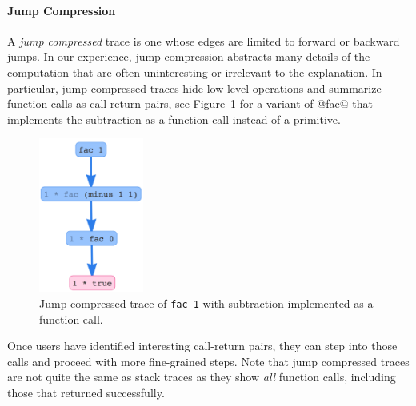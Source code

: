 \paragraph{Jump Compression}
%
A \emph{jump compressed} trace is one whose edges are limited to forward
or backward jumps.
%
In our experience, jump compression abstracts many details of the
computation that are often uninteresting or irrelevant to the
explanation.
%
In particular, jump compressed traces hide low-level operations and
summarize function calls as call-return pairs, see
Figure~\ref{fig:fac-jump} for a variant of @fac@ that implements the
subtraction as a function call instead of a primitive.
%
\begin{figure}[t]
\centering
\includegraphics[height=2in]{fac-minus.png}
\caption{Jump-compressed trace of \texttt{fac 1} with subtraction
  implemented as a function call.}
\label{fig:fac-jump}
\end{figure}
%
Once users have identified interesting call-return pairs, they can
step into those calls and proceed with more fine-grained steps.
%
%
Note that jump compressed traces are not quite the same as
stack traces as they show \emph{all} function calls, including
those that returned successfully.
%




